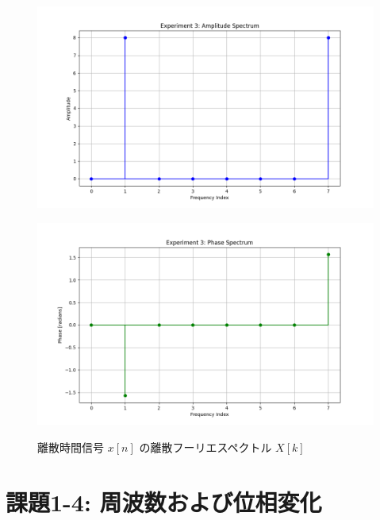 \documentclass[fleqn, a4paper. 12pt]{jsarticle}
\begin{document}
  \begin{figure}[h]
    \begin{center}
    \begin{minipage}[t]{0.48\columnwidth}
        \includegraphics[width=\columnwidth]{amplitude_spectrum_experiment_3.png}
        \label{fign:a3}
    \end{minipage}
    \begin{minipage}[t]{0.48\columnwidth}
        \includegraphics[width=\columnwidth]{phase_spectrum_experiment_3.png}
        \label{fign:p3}
    \end{minipage}
    \end{center}
    \caption{離散時間信号 $x[n]$ の離散フーリエスペクトル $X[k]$}
  \end{figure}

  \newpage

  \section*{課題1-4: 周波数および位相変化}
\end{document}
